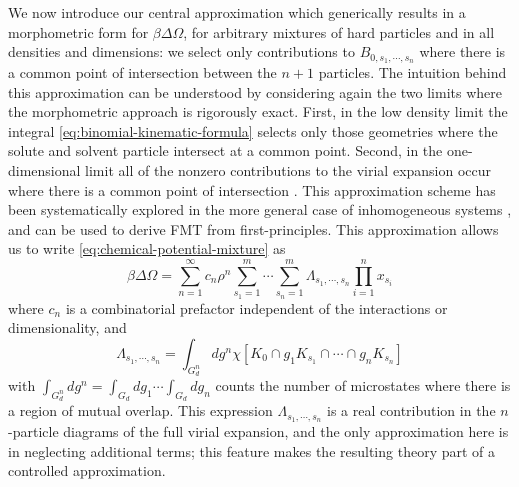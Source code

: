 \documentclass[11pt,twoside]{report}
\begin{document}
We now introduce our central approximation which generically results in a morphometric form for $\beta \Delta \Omega$, for arbitrary mixtures of hard particles and in all densities and dimensions: we select only contributions to $B_{0, s_1, \cdots, s_n}$ where there is a common point of intersection between the $n+1$ particles.
The intuition behind this approximation can be understood by considering again the two limits where the morphometric approach is rigorously exact.
First, in the low density limit the integral \eqref{eq:binomial-kinematic-formula} selects only those geometries where the solute and solvent particle intersect at a common point.
Second, in the one-dimensional limit all of the nonzero contributions to the virial expansion occur where there is a common point of intersection \cite{MarechalPRE2014}.
This approximation scheme has been systematically explored in the more general case of inhomogeneous systems \cite{LeithallPRE2011,KordenPRE2012,MarechalPRE2014}, and can be used to derive FMT from first-principles.
This approximation allows us to write \eqref{eq:chemical-potential-mixture} as
\begin{equation}\label{eq:insertion-with-lambda}
  \beta \Delta \Omega
  =
  \sum_{n=1}^\infty
  c_n
  \rho^n
  \sum_{s_1=1}^m \cdots \sum_{s_n=1}^m
  \Lambda_{s_1, \cdots, s_n}
  \prod_{i=1}^n x_{s_i}
\end{equation}
where $c_n$ is a combinatorial prefactor independent of the interactions or dimensionality, and
\begin{equation}\label{eq:n-particle-intersection-integral}
  \Lambda_{s_1, \cdots, s_n}
  =
  \int_{G_d^n} dg^n \chi[K_0 \cap g_1 K_{s_1} \cap \cdots \cap g_n K_{s_n}]
\end{equation}
with $\int_{G_d^n} dg^n = \int_{G_d} dg_1 \cdots \int_{G_d} dg_n$ counts the number of microstates where there is a region of mutual overlap.
This expression $\Lambda_{s_1, \cdots, s_n}$ is a real contribution in the $n$-particle diagrams of the full virial expansion, and the only approximation here is in neglecting additional terms; this feature makes the resulting theory part of a controlled approximation.
\end{document}
